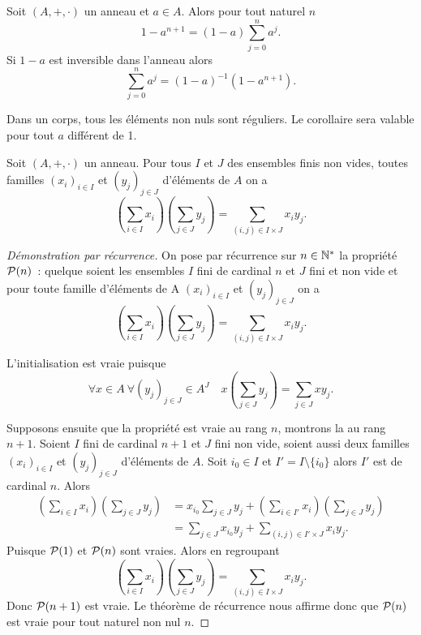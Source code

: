 \begin{corth}
  Soit \((A,+,\cdot)\) un anneau et \(a \in A\). Alors pour tout naturel \(n\)
  \begin{equation}
    1-a^{n+1}=(1-a)\sum_{j=0}^n a^j.
  \end{equation}
  Si \(1-a\) est inversible dans l'anneau alors
  \begin{equation}
    \sum_{j=0}^n a^j = (1-a)^{-1}(1-a^{n+1}).
  \end{equation}
\end{corth}
Dans un corps, tous les éléments non nuls sont réguliers. Le corollaire sera valable pour tout \(a\) différent de 1.

\begin{theo}
  Soit \((A,+,\cdot)\) un anneau. Pour tous \(I\) et \(J\) des ensembles finis non vides, toutes familles \((x_i)_{i \in I}\) et \((y_j)_{j \in J}\) d'éléments de \(A\) on a
  \begin{equation}
    \left(\sum_{i \in I} x_i \right)\left(\sum_{j \in J} y_j \right) = \sum_{(i,j)\in I\times J} x_iy_j.
  \end{equation}
\end{theo}
\begin{proof}[Démonstration par récurrence]
  On pose par récurrence sur \(n \in \N^*\) la propriété \(\P(n)\)~: quelque soient les ensembles \(I\) fini de cardinal \(n\) et \(J\) fini et non vide et pour toute famille d'éléments de A \((x_i)_{i \in I}\) et \((y_j)_{j \in J}\) on a
\begin{equation} 
  \left(\sum_{i \in I} x_i \right)\left(\sum_{j \in J} y_j \right) = \sum_{(i,j)\in I\times J} x_iy_j.
\end{equation}

L'initialisation est vraie puisque
\begin{equation}
  \forall x \in A \ \forall (y_j)_{j \in J} \in A^J \quad x \left(\sum_{j \in J} y_j \right) = \sum_{j \in J} xy_j.
\end{equation}

Supposons ensuite que la propriété est vraie au rang \(n\), montrons la au rang \(n+1\). Soient \(I\) fini de cardinal \(n+1\) et \(J\) fini non vide, soient aussi deux familles \((x_i)_{i \in I}\) et \((y_j)_{j \in J}\) d'éléments de \(A\). Soit \(i_0 \in I\) et \(I'=I\setminus\{i_0\}\) alors \(I'\) est de cardinal \(n\). Alors
\begin{align}
  \left(\sum_{i \in I} x_i \right)\left(\sum_{j \in J} y_j \right) &=x_{i_0} \sum_{j \in J} y_j + \left(\sum_{i \in I'} x_i \right)\left(\sum_{j \in J} y_j \right) \\
&=\sum_{j \in J} x_{i_0}y_j +  \sum_{(i,j)\in I'\times J} x_iy_j.
\end{align}
Puisque \(\P(1)\) et \(\P(n)\) sont vraies. Alors en regroupant
\begin{equation}
  \left(\sum_{i \in I} x_i \right)\left(\sum_{j \in J} y_j \right) = \sum_{(i,j)\in I\times J} x_iy_j.
\end{equation}
Donc \(\P(n+1)\) est vraie. Le théorème de récurrence nous affirme donc que \(\P(n)\) est vraie pour tout naturel non nul \(n\).
\end{proof}
